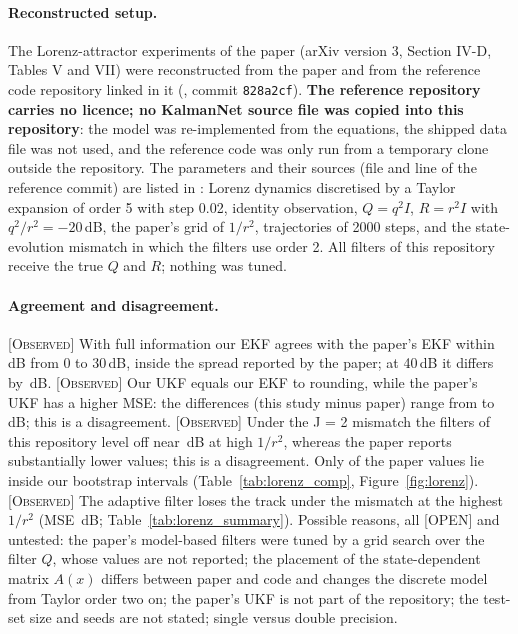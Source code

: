 \documentclass[11pt,a4paper]{article}
\newcommand{\obs}{\textsc{[Observed]}}
\newcommand{\openlbl}{\textsc{[OPEN]}}
\begin{document}
\paragraph{Reconstructed setup.} The Lorenz-attractor experiments of the paper \citep{revach2022}
(arXiv version 3, Section IV-D, Tables V and VII) were reconstructed from the paper and from the
reference code repository linked in it (, commit
\texttt{828a2cf}). \textbf{The reference repository carries no licence; no KalmanNet source file was
copied into this repository}: the model was re-implemented from the equations, the shipped data file
was not used, and the reference code was only run from a temporary clone outside the repository.
The parameters and their sources (file and line of the reference commit) are listed in
: Lorenz dynamics discretised by a Taylor expansion of
order 5 with step 0.02, identity observation, $Q=q^2I$, $R=r^2I$ with $q^2/r^2=-20$\,dB, the paper's
grid of $1/r^2$, trajectories of 2000 steps, and the state-evolution mismatch in which the filters
use order 2. All filters of this repository receive the true $Q$ and $R$; nothing was tuned.



\paragraph{Agreement and disagreement.} \obs{} With full information our EKF agrees with the
paper's EKF within \LorEKFlowMaxAbsDiff\,dB from 0 to 30\,dB, inside the spread reported by the
paper; at 40\,dB it differs by \LorEKFhighDiff\,dB. \obs{} Our UKF equals our EKF to rounding,
while the paper's UKF has a higher MSE: the differences (this study minus paper) range from
\LorUKFdiffMin{} to \LorUKFdiffMax{} dB; this is a disagreement. \obs{} Under the J = 2 mismatch the filters of this repository level
off near \LorJtwoPlateau\,dB at high $1/r^2$, whereas the paper reports substantially lower values;
this is a disagreement. Only \LorInsideCount{} of the \LorCompTotal{} paper values lie inside our
bootstrap intervals (Table~\ref{tab:lorenz_comp}, Figure~\ref{fig:lorenz}). \obs{} The adaptive
filter loses the track under the mismatch at the highest $1/r^2$ (MSE \LorAdaptJtwoForty\,dB;
Table~\ref{tab:lorenz_summary}). Possible reasons, all \openlbl{} and untested: the paper's
model-based filters were tuned by a grid search over the filter $Q$, whose values are not reported;
the placement of the state-dependent matrix $A(x)$ differs between paper and code and changes the
discrete model from Taylor order two on; the paper's UKF is not part of the repository; the test-set
size and seeds are not stated; single versus double precision.
\end{document}
